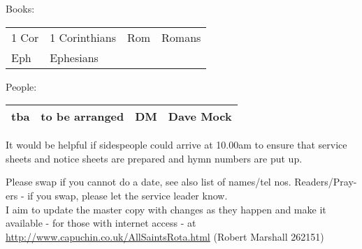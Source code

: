 \documentclass[10pt]{article}
\begin{document}
\begin{center}
\vspace{1em}
Books: \begin{tabular}{|l|l|l|l|} \hline
 1 Cor & 1 Corinthians &
Rom & Romans \\
Eph & Ephesians &
&
  \\ \hline
\end{tabular}
People: \begin{tabular}{|c|c|c|c|}\hline
 tba & to be arranged & DM &  Dave Mock \\
     \hline
  \end{tabular}
\end{center}
\begin{minipage}{0.7\textwidth}
{\footnotesize It would be helpful if sidespeople 
could arrive at 10.00am to ensure that service sheets and notice sheets are 
prepared and hymn numbers are put up.

Please swap if you cannot do a date, see also list of names/tel nos.
Readers/Pray-ers - if you swap, please let the service leader know.\\
I aim to update the master copy with changes as they
happen and make it available - for those with internet access
\linebreak - at
\url{http://www.capuchin.co.uk/AllSaintsRota.html} 
(Robert Marshall 262151)}
\end{minipage}
\begin{minipage}{0.3\textwidth}
\ifpdf
\else
\hspace{2em}
\fi
\end{minipage}
\end{document}
